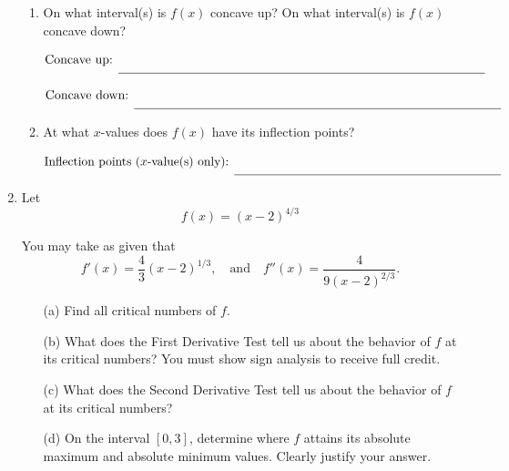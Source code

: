 \documentclass[11pt]{article}
\begin{document}
\begin{enumerate}
\begin{enumerate}
    \item On what interval(s) is $f(x)$ concave up? On what interval(s) is $f(x)$ concave down?
\vspace{3cm}


    {\large
        \[\text{Concave up: } \rule[-8pt]{4in}{0.4pt}\]
    }

    {\large
        \[\text{Concave down: } \rule[-8pt]{4in}{0.4pt}\]
    }



    \item At what $x$-values does $f(x)$ have its inflection points?
\vspace{3cm}


    {\large
        \[\text{Inflection points ($x$-value(s) only): } \rule[-8pt]{3in}{0.4pt}\]
    }
\end{enumerate}


\newpage


\item Let 
\[
f(x) = (x - 2)^{4/3}
\]

You may take as given that
\[
f'(x) = \frac{4}{3}(x - 2)^{1/3} , \quad \text{and} \quad f''(x) = \frac{4}{9(x-2)^{2/3}}.
\]

\begin{enumerate}

\item[(a)] Find all critical numbers of $f$.

\vspace{4cm}

\item[(b)] What does the First Derivative Test tell us about the behavior of $f$ at its critical numbers?  
You must show sign analysis to receive full credit.

\vspace{4cm}

\item[(c)] What does the Second Derivative Test tell us about the behavior of $f$ at its critical numbers?  

\vspace{4cm}

\item[(d)] On the interval $[0,3]$, determine where $f$ attains its absolute maximum and absolute minimum values. Clearly justify your answer.


\end{enumerate}
\end{enumerate}
\end{document}
